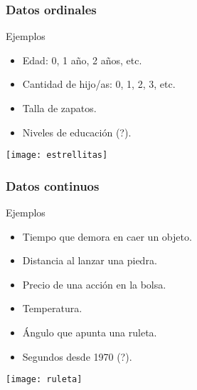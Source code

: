 \documentclass[table]{beamer}
\begin{document}
\begin{frame}
    \frametitle{Datos ordinales}
    \begin{exampleblock}{Ejemplos}
        \begin{itemize}
            \item Edad: 0, 1 año, 2 años, etc.
            \item Cantidad de hijo/as: 0, 1, 2, 3, etc.
            \item Talla de zapatos.
            \item Niveles de educación (?).
        \end{itemize}
    \end{exampleblock}
    \begin{center}
        \texttt{[image: estrellitas]}
    \end{center}
\end{frame}

\begin{frame}
    \frametitle{Datos continuos}
    \begin{exampleblock}{Ejemplos}
        \begin{itemize}
            \item Tiempo que demora en caer un objeto.
            \item Distancia al lanzar una piedra.
            \item Precio de una acción en la bolsa.
            \item Temperatura.
            \item Ángulo que apunta una ruleta.
            \item Segundos desde 1970 (?).
        \end{itemize}
    \end{exampleblock}
    \begin{center}
        \texttt{[image: ruleta]}
    \end{center}
\end{frame}
\end{document}
